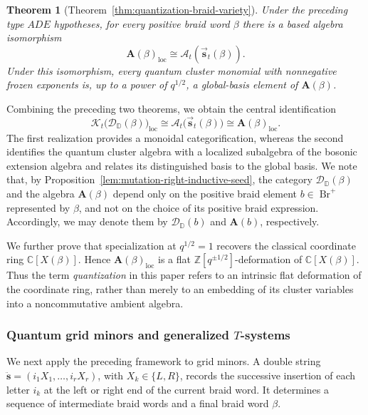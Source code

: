\documentclass[12pt, reqno]{amsart}
\theoremstyle{plain}
\newtheorem{theorem}{Theorem}[section]
\theoremstyle{definition}
\numberwithin{equation}{section}
\newcommand{\ZZ}{\mathbb{Z}}
\newcommand{\CC}{\mathbb{C}}
\newcommand{\DD}{\mathbb{D}}
\newcommand{\Br}{{\operatorname{Br}}}
\begin{document}
\begin{theorem}[Theorem~\ref{thm:quantization-braid-variety}]
\label{thm:bosonic-realization}
Under the preceding type \(ADE\)
hypotheses, for every positive braid word \(\beta\) there is a based algebra
isomorphism
\[\mathbf A(\beta)_{\mathrm{loc}}
\cong
\mathcal A_t(\overrightarrow{\mathbf s}_t(\beta)).\]
Under this isomorphism, every quantum cluster monomial with
nonnegative frozen exponents is, up to a power of \(q^{1/2}\), a
global-basis element of \(\mathbf A(\beta)\).
\end{theorem}

Combining the preceding two theorems, we obtain the central
identification
\begin{equation}\label{eq:intro-main-identifications}
    \mathcal K_t\bigl(\mathscr D_{\DD}(\beta)\bigr)_{\mathrm{loc}}
    \cong
    \mathcal A_t\bigl(\overrightarrow{\mathbf s}_t(\beta)\bigr)
    \cong
    \mathbf A(\beta)_{\mathrm{loc}}.
\end{equation}
The first realization provides a monoidal categorification, whereas
the second identifies the quantum cluster algebra with a localized
subalgebra of the bosonic extension algebra and relates its
distinguished basis to the global basis. We note that, by Proposition~\ref{lem:mutation-right-inductive-seed},
the category \(\mathscr D_{\DD}(\beta)\) and the algebra
\(\mathbf A(\beta)\) depend only on the positive braid element
\(b\in\Br^+\) represented by \(\beta\), and not on the choice of its
positive braid expression. Accordingly, we may denote them by
\(\mathscr D_{\DD}(b)\) and \(\mathbf A(b)\), respectively.

We further prove that specialization at \(q^{1/2}=1\) recovers the
classical coordinate ring \(\CC[X(\beta)]\). Hence
\(\mathbf A(\beta)_{\mathrm{loc}}\) is a flat
\(\ZZ[q^{\pm1/2}]\)-deformation of \(\CC[X(\beta)]\). Thus the term
\emph{quantization} in this paper refers to an intrinsic flat
deformation of the coordinate ring, rather than merely to an
embedding of its cluster variables into a noncommutative ambient
algebra.

\subsubsection{Quantum grid minors and generalized \(T\)-systems}

We next apply the preceding framework to grid minors. A double
string \(\ddot{\mathbf s}=(i_1X_1,\ldots,i_rX_r)\), with
\(X_k\in\{L,R\}\), records the successive insertion of each letter
\(i_k\) at the left or right end of the current braid word. It
determines a sequence of intermediate braid words and a final braid
word \(\beta\).
\end{document}
